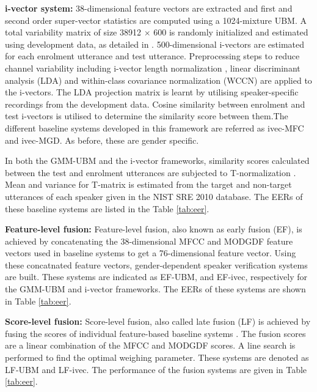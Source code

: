 \documentclass{article}
\begin{document}
\textbf{i-vector system:} 
38-dimensional feature vectors are extracted and first and second order
super-vector statistics are computed using a 1024-mixture UBM. A total
variability matrix of size 38912 $\times$ 600 is randomly initialized and
estimated using development data, as detailed in \cite{dehak_ivector,
kenny_JFA}.  500-dimensional i-vectors are estimated for each enrolment
utterance and test utterance. Preprocessing steps to reduce channel variability
including i-vector length normalization \cite{garciaRomero}, linear discriminant
analysis (LDA) and within-class covariance normalization (WCCN) are applied to
the i-vectors.  The LDA projection matrix is learnt by utilising
speaker-specific recordings from the development data. %
Cosine similarity between enrolment and test i-vectors is utilised to determine
the similarity score between them.The different baseline systems developed in
this framework are referred as ivec-MFC and ivec-MGD. As before, these are
gender specific.

In both the GMM-UBM and the i-vector frameworks, similarity
scores calculated between the test and enrolment utterances 
are subjected to T-normalization \cite{tnorm}. Mean and variance for T-matrix is
estimated from the target and non-target utterances of each speaker given in the 
NIST SRE 2010 database.
The EERs of these baseline systems are listed in the Table \ref{tab:eer}.


\textbf{Feature-level fusion:} 
Feature-level fusion, also known as early fusion (EF),
is achieved by concatenating the 38-dimensional MFCC and MODGDF feature vectors 
used in baseline systems to get a 76-dimensional feature vector. Using these
concatnated feature vectors, gender-dependent speaker verification systems
are built. These systems are indicated as EF-UBM, and EF-ivec, respectively for
the GMM-UBM and i-vector frameworks. The EERs of these systems are shown in 
Table  \ref{tab:eer}.

\textbf{Score-level fusion:}  Score-level fusion, also called late fusion (LF)
is achieved by fusing the scores of individual feature-based baseline systems
\cite{fusion}. The fusion scores are a linear combination of the MFCC and MODGDF
scores. A line search is performed to find the optimal weighing parameter. These
systems are denoted as LF-UBM and LF-ivec.  The performance of the fusion
systems are given in Table \ref{tab:eer}. 
\end{document}
